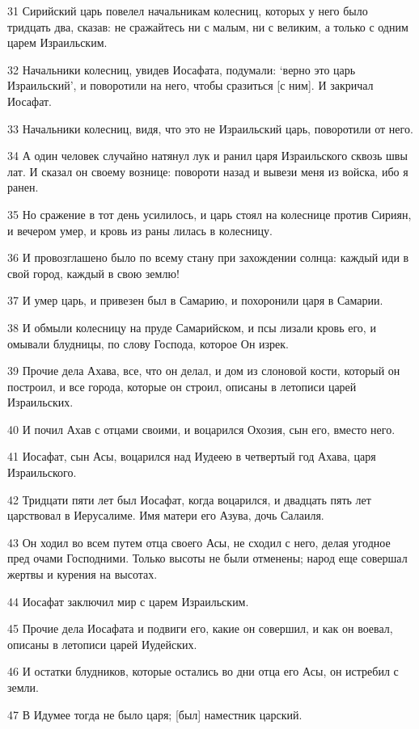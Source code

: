 \par 31 Сирийский царь повелел начальникам колесниц, которых у него было тридцать два, сказав: не сражайтесь ни с малым, ни с великим, а только с одним царем Израильским.
\par 32 Начальники колесниц, увидев Иосафата, подумали: `верно это царь Израильский', и поворотили на него, чтобы сразиться [с ним]. И закричал Иосафат.
\par 33 Начальники колесниц, видя, что это не Израильский царь, поворотили от него.
\par 34 А один человек случайно натянул лук и ранил царя Израильского сквозь швы лат. И сказал он своему вознице: повороти назад и вывези меня из войска, ибо я ранен.
\par 35 Но сражение в тот день усилилось, и царь стоял на колеснице против Сириян, и вечером умер, и кровь из раны лилась в колесницу.
\par 36 И провозглашено было по всему стану при захождении солнца: каждый иди в свой город, каждый в свою землю!
\par 37 И умер царь, и привезен был в Самарию, и похоронили царя в Самарии.
\par 38 И обмыли колесницу на пруде Самарийском, и псы лизали кровь его, и омывали блудницы, по слову Господа, которое Он изрек.
\par 39 Прочие дела Ахава, все, что он делал, и дом из слоновой кости, который он построил, и все города, которые он строил, описаны в летописи царей Израильских.
\par 40 И почил Ахав с отцами своими, и воцарился Охозия, сын его, вместо него.
\par 41 Иосафат, сын Асы, воцарился над Иудеею в четвертый год Ахава, царя Израильского.
\par 42 Тридцати пяти лет был Иосафат, когда воцарился, и двадцать пять лет царствовал в Иерусалиме. Имя матери его Азува, дочь Салаиля.
\par 43 Он ходил во всем путем отца своего Асы, не сходил с него, делая угодное пред очами Господними. Только высоты не были отменены; народ еще совершал жертвы и курения на высотах.
\par 44 Иосафат заключил мир с царем Израильским.
\par 45 Прочие дела Иосафата и подвиги его, какие он совершил, и как он воевал, описаны в летописи царей Иудейских.
\par 46 И остатки блудников, которые остались во дни отца его Асы, он истребил с земли.
\par 47 В Идумее тогда не было царя; [был] наместник царский.
